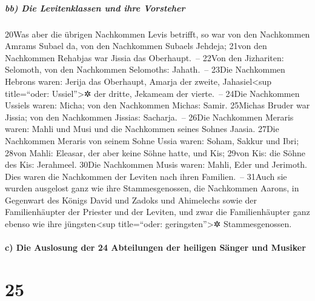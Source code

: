 \hypertarget{bb-die-levitenklassen-und-ihre-vorsteher}{%
\subparagraph{bb) Die Levitenklassen und ihre
Vorsteher}\label{bb-die-levitenklassen-und-ihre-vorsteher}}

20Was aber die übrigen Nachkommen Levis betrifft, so war von den
Nachkommen Amrams Subael da, von den Nachkommen Subaels Jehdeja; 21von
den Nachkommen Rehabjas war Jissia das Oberhaupt.~-- 22Von den
Jizhariten: Selomoth, von den Nachkommen Selomoths: Jahath.~-- 23Die
Nachkommen Hebrons waren: Jerija das Oberhaupt, Amarja der zweite,
Jahasiel\textless sup title=``oder: Ussiel''\textgreater✲ der dritte,
Jekameam der vierte.~-- 24Die Nachkommen Ussiels waren: Micha; von den
Nachkommen Michas: Samir. 25Michas Bruder war Jissia; von den Nachkommen
Jissias: Sacharja.~-- 26Die Nachkommen Meraris waren: Mahli und Musi und
die Nachkommen seines Sohnes Jaasia. 27Die Nachkommen Meraris von seinem
Sohne Ussia waren: Soham, Sakkur und Ibri; 28von Mahli: Eleasar, der
aber keine Söhne hatte, und Kis; 29von Kis: die Söhne des Kis:
Jerahmeel. 30Die Nachkommen Musis waren: Mahli, Eder und Jerimoth. Dies
waren die Nachkommen der Leviten nach ihren Familien.~-- 31Auch sie
wurden ausgelost ganz wie ihre Stammesgenossen, die Nachkommen Aarons,
in Gegenwart des Königs David und Zadoks und Ahimelechs sowie der
Familienhäupter der Priester und der Leviten, und zwar die
Familienhäupter ganz ebenso wie ihre jüngsten\textless sup title=``oder:
geringsten''\textgreater✲ Stammesgenossen.

\hypertarget{c-die-auslosung-der-24-abteilungen-der-heiligen-suxe4nger-und-musiker}{%
\paragraph{c) Die Auslosung der 24 Abteilungen der heiligen Sänger und
Musiker}\label{c-die-auslosung-der-24-abteilungen-der-heiligen-suxe4nger-und-musiker}}

\hypertarget{section-24}{%
\section{25}\label{section-24}}

